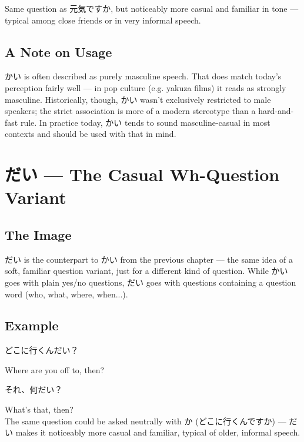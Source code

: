 \documentclass[12pt]{book}
\begin{document}
Same question as 元気ですか, but noticeably more casual and familiar in tone — typical among close friends or in very informal speech.

\section*{A Note on Usage}

かい is often described as purely masculine speech. That does match today's perception fairly well — in pop culture (e.g. yakuza films) it reads as strongly masculine. Historically, though, かい wasn't exclusively restricted to male speakers; the strict association is more of a modern stereotype than a hard-and-fast rule. In practice today, かい tends to sound masculine-casual in most contexts and should be used with that in mind.


\chapter{だい — The Casual Wh-Question Variant}

\section*{The Image}

だい is the counterpart to かい from the previous chapter — the same idea of a soft, familiar question variant, just for a different kind of question. While かい goes with plain yes/no questions, だい goes with questions containing a question word (who, what, where, when...).

\section*{Example}

\par\quad どこに行くんだい？\\
\par\quad Where are you off to, then?\\

\par\quad それ、何だい？\\
\par\quad What's that, then?\\

The same question could be asked neutrally with か (どこに行くんですか) — だい makes it noticeably more casual and familiar, typical of older, informal speech.
\end{document}
